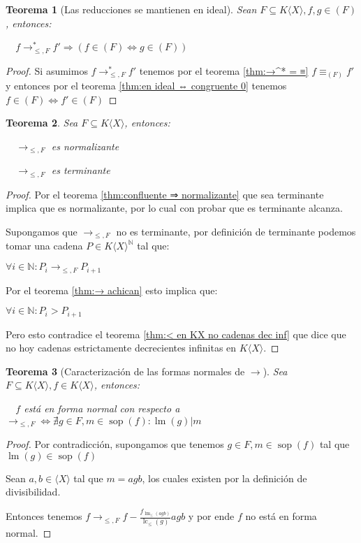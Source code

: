 \documentclass{amsbook}
\theoremstyle{customstyle}
\newtheorem{theorem}{Teorema}[section]
\DeclareMathOperator{\sop}{sop}
\DeclareMathOperator{\lm}{lm}
\DeclareMathOperator{\lc}{lc}
\begin{document}
\begin{theorem}[Las reducciones se mantienen en ideal]\label{thm:→ mantiene pertenencia a ideal}
Sean $F ⊆ K⟨X⟩, f, g ∈ (F)$, entonces:

  $f →^*_{≤, F} f' ⇒ (f ∈ (F) ⇔ g ∈ (F))$

\end{theorem}
\begin{proof}
Si asumimos $f →^*_{≤, F} f'$ tenemos por el teorema \ref{thm:→^* = ≡} $f ≡_{(F)} f'$ y entonces por el teorema \ref{thm:en ideal ⇔ congruente 0} tenemos $f ∈ (F) ⇔ f' ∈ (F)$
\end{proof}

\begin{theorem}
Sea $F ⊆ K⟨X⟩$, entonces:

  $→_{≤, F}$ es normalizante

  $→_{≤, F}$ es terminante
\end{theorem}
\begin{proof}
Por el teorema \ref{thm:confluente ⇒ normalizante} que sea terminante implica que es normalizante, por lo cual con probar que es terminante alcanza.

Supongamos que $→_{≤, F}$ no es terminante, por definición de terminante podemos tomar una cadena $P ∈ K⟨X⟩^ℕ$ tal que:

$∀i ∈ ℕ : P_i →_{≤, F} P_{i+1}$

Por el teorema \ref{thm:→ achican} esto implica que:

$∀i ∈ ℕ : P_i > P_{i+1}$

Pero esto contradice el teorema \ref{thm:< en KX no cadenas dec inf} que dice que no hoy cadenas estrictamente decrecientes infinitas en $K⟨X⟩$.

\end{proof}

\begin{theorem}[Caracterización de las formas normales de $→$]
Sea $F ⊆ K⟨X⟩, f ∈ K⟨X⟩$, entonces:

  $f$ está en forma normal con respecto a $→_{≤, F} ⇔ ∄g ∈ F, m ∈ \sop(f) : \lm(g) | m$

\end{theorem}
\begin{proof}
Por contradicción, supongamos que tenemos $g ∈ F, m ∈ \sop(f)$ tal que $\lm(g) ∈ \sop(f)$

Sean $a, b ∈ ⟨X⟩$ tal que $m = agb$, los cuales existen por la definición de divisibilidad.

Entonces tenemos $f →_{≤, F} f - \frac{f_{\lm_≤(agb)}}{\lc_≤(g)}agb$ y por ende $f$ no está en forma normal.

\end{proof}
\end{document}
